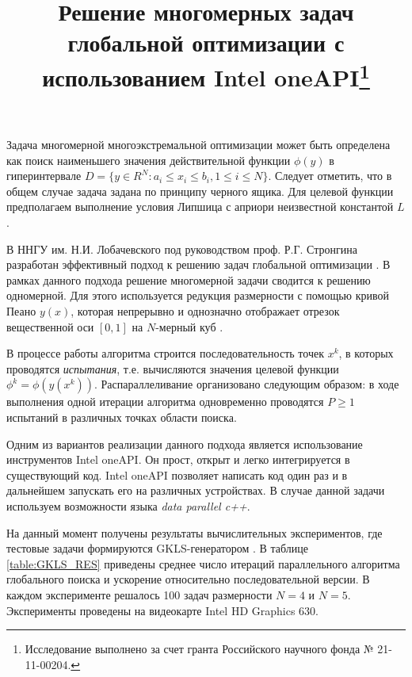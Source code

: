 \documentclass[11pt, oneside, a4paper]{article}
\begin{document}

\title{Решение многомерных задач глобальной оптимизации с использованием Intel oneAPI\footnote{Исследование выполнено за счет гранта Российского научного фонда № 21-11-00204.}}



Задача многомерной многоэкстремальной оптимизации может быть определена как поиск наименьшего значения действительной функции \(\phi(y)\)  в гиперинтервале \(D=\{y\in R^N:a_i\leqslant x_i\leqslant{b_i}, 1\leqslant{i}\leqslant{N}\}\). 
Следует отметить, что в общем случае задача задана по принципу черного ящика. Для целевой функции предполагаем выполнение условия Липшица с априори неизвестной константой \(L\).

В ННГУ им. Н.И. Лобачевского под руководством проф. Р.Г. Стронгина разработан эффективный подход к решению задач глобальной оптимизации \cite{Strongin2013}. В рамках данного подхода решение многомерной задачи сводится к решению одномерной. Для этого используется редукция размерности с помощью кривой Пеано \(y(x)\), которая непрерывно и однозначно отображает отрезок вещественной оси \([0,1]\) на \(N\)-мерный куб \cite{Sergeyev2013}.


В процессе работы алгоритма строится последовательность точек \(x^k\), в которых проводятся \textit{испытания}, т.е. вычисляются значения целевой функции \(\phi^k=\phi(y(x^k))\). Распараллеливание организовано следующим образом: в ходе выполнения одной итерации алгоритма одновременно проводятся \(P \geq 1\) испытаний в различных точках области поиска.

Одним из вариантов реализации данного подхода является использование инструментов Intel oneAPI. Он прост, открыт и легко интегрируется в существующий код. Intel oneAPI позволяет написать код один раз и в дальнейшем запускать его на различных устройствах. В случае данной задачи используем возможности языка \textit{data parallel c++}.


На данный момент получены результаты вычислительных экспериментов, где тестовые задачи формируются GKLS-генератором \cite{GKLS}. В таблице \ref{table:GKLS_RES} приведены среднее число итераций параллельного алгоритма глобального поиска и ускорение относительно последовательной версии. В каждом эксперименте решалось 100 задач размерности \(N = 4\) и \(N = 5\). Эксперименты проведены на видеокарте Intel HD Graphics 630.
\end{document}
